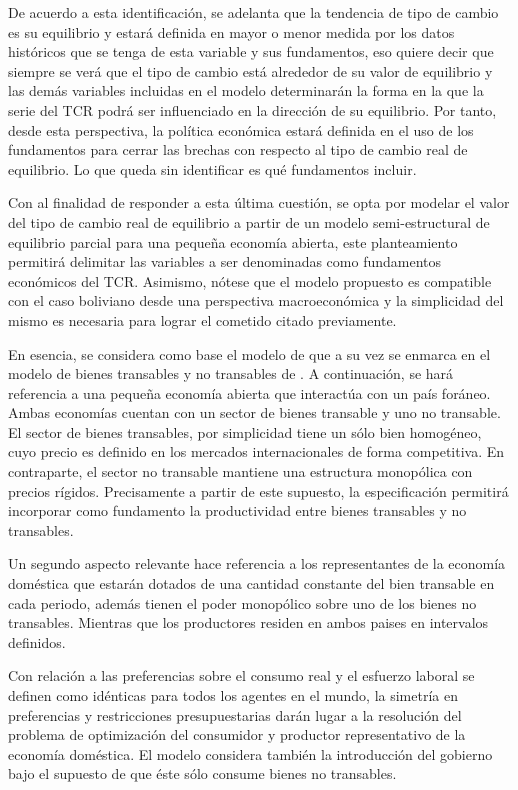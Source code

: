 \documentclass[12pt,letterpaper]{article}
\begin{document}
De acuerdo a esta identificación, se adelanta que la tendencia de tipo de cambio es su equilibrio y estará definida en mayor o menor medida por los datos históricos que se tenga de esta variable y sus fundamentos, eso quiere decir que siempre se verá que el tipo de cambio está alrededor de su valor de equilibrio y las demás variables incluidas en el modelo determinarán la forma en la que la serie del TCR podrá ser influenciado en la dirección de su equilibrio. Por tanto, desde esta perspectiva, la política económica estará definida en el uso de los fundamentos para cerrar las brechas con respecto al tipo de cambio real de equilibrio. Lo que queda sin identificar es qué fundamentos incluir.

Con al finalidad de responder a esta última cuestión, se opta por modelar el valor del tipo de cambio real de equilibrio a partir de un modelo semi-estructural de equilibrio parcial para una pequeña economía abierta, este planteamiento permitirá delimitar las variables a ser denominadas como fundamentos económicos del TCR. Asimismo, nótese que el modelo propuesto es compatible con el caso boliviano desde una perspectiva macroeconómica y la simplicidad del mismo es necesaria para lograr el cometido citado previamente.

En esencia, se considera como base el modelo de \cite{Calderon2004exchange} que a su vez se enmarca en el modelo de bienes transables y no transables de \cite{Obstfeld1995dynamics}. A continuación, se hará referencia a una pequeña economía abierta que interactúa con un país foráneo. Ambas economías cuentan con un sector de bienes transable y uno no transable. El sector de bienes transables, por simplicidad tiene un sólo bien homogéneo, cuyo precio es definido en los mercados internacionales de forma competitiva. En contraparte, el sector no transable mantiene una estructura monopólica con precios rígidos. Precisamente a partir de este supuesto, la especificación permitirá incorporar como fundamento la productividad entre bienes transables y no transables. 

Un segundo aspecto relevante hace referencia a los representantes de la economía doméstica que estarán dotados de una cantidad constante del bien transable en cada periodo, además tienen el poder monopólico sobre uno de los bienes no transables. Mientras que los productores residen en ambos paises en intervalos definidos. 

Con relación a las preferencias sobre el consumo real y el esfuerzo laboral se definen como idénticas para todos los agentes en el mundo, la simetría en preferencias y restricciones presupuestarias darán lugar a la resolución del problema de optimización del consumidor y productor representativo de la economía doméstica. El modelo considera también la introducción del gobierno bajo el supuesto de que éste sólo consume bienes no transables.  
\end{document}

